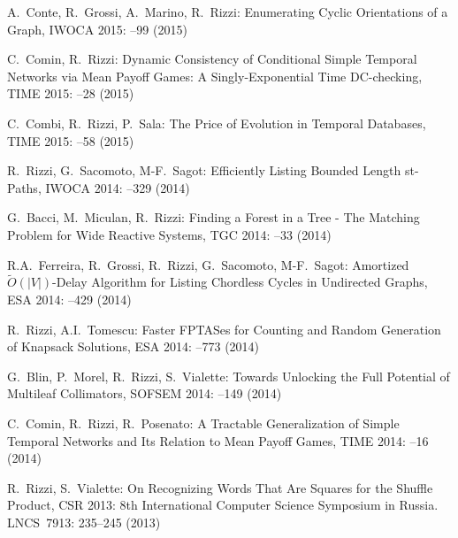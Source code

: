 \begin{etaremune}
  \item {\sc A.~Conte, R.~Grossi, A.~Marino, R.~Rizzi:}
   \newblock Enumerating Cyclic Orientations of a Graph,
   \newblock IWOCA 2015:
   --99 (2015)

  \item {\sc C.~Comin, R.~Rizzi:}
   \newblock Dynamic Consistency of Conditional Simple Temporal Networks via Mean Payoff Games: A Singly-Exponential Time DC-checking,
   \newblock TIME 2015:
   --28 (2015)

  \item {\sc C.~Combi, R.~Rizzi, P.~Sala:}
   \newblock The Price of Evolution in Temporal Databases,
   \newblock TIME 2015:
   --58 (2015)

  \item {\sc R.~Rizzi, G.~Sacomoto, M-F.~Sagot:}
   \newblock Efficiently Listing Bounded Length st-Paths,
   \newblock IWOCA 2014:
   --329 (2014)

  \item {G.~Bacci, M.~Miculan, R.~Rizzi:}
   \newblock Finding a Forest in a Tree - The Matching Problem for Wide Reactive Systems,
   \newblock TGC 2014:
   --33 (2014)

  \item {R.A.~Ferreira, R.~Grossi, R.~Rizzi, G.~Sacomoto, M-F.~Sagot:}
   \newblock Amortized $\tilde{O}(|V|)$-Delay Algorithm for Listing Chordless Cycles in Undirected Graphs,
   \newblock ESA 2014:
   --429 (2014)

  \item {R.~Rizzi, A.I.~Tomescu:}
   \newblock Faster FPTASes for Counting and Random Generation of Knapsack Solutions,
   \newblock ESA 2014:
   --773 (2014)

  \item {G.~Blin, P.~Morel, R.~Rizzi, S.~Vialette:}
   \newblock Towards Unlocking the Full Potential of Multileaf Collimators,
   \newblock SOFSEM 2014:
   --149 (2014)

  \item {C.~Comin, R.~Rizzi, R.~Posenato:}
   \newblock A Tractable Generalization of Simple Temporal Networks and Its Relation to Mean Payoff Games,
   \newblock TIME 2014:
   --16 (2014)

  \item {R.~Rizzi, S.~Vialette:}
   \newblock On Recognizing Words That Are Squares for the Shuffle Product,
   \newblock CSR 2013: 8th International Computer Science Symposium in Russia.
   \newblock LNCS~7913: 235--245 (2013)


\end{etaremune}

